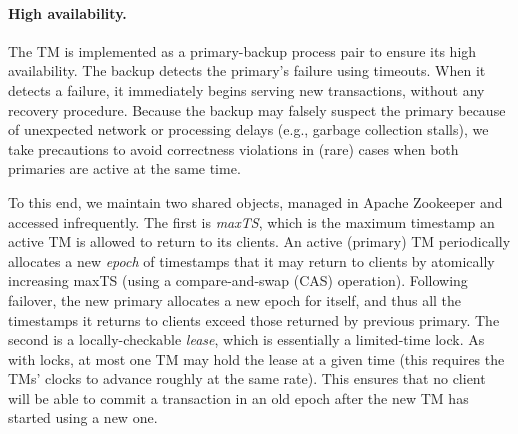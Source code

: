 \paragraph{High availability.} The TM is implemented as a primary-backup process pair to ensure its high availability. 
The backup detects the primary's failure using timeouts. When it detects a failure, it immediately begins serving new
transactions, without any recovery procedure. Because the backup may falsely suspect the primary because of
unexpected network or processing delays (e.g., garbage collection stalls), we take precautions to avoid correctness
violations in (rare) cases when both primaries are active at the same time.

To this end, we maintain two shared objects, managed in Apache Zookeeper and accessed infrequently.
The first is \emph{maxTS}, which is the maximum timestamp an active TM is allowed to return to its clients.
An active (primary) TM periodically allocates a new \emph{epoch} of timestamps that it may return to clients by atomically
increasing maxTS (using a compare-and-swap (CAS) operation).  
Following failover, the new primary  allocates a new epoch for itself, and thus all the timestamps it returns to clients
exceed those returned by previous primary. 
The second is a locally-checkable \emph{lease}, which is essentially a  limited-time lock. 
As with locks, at most one TM may hold the lease at a given time (this requires the TMs' clocks to advance roughly at the same rate). 
This ensures that no client will be able to commit a transaction in an old epoch after the new TM has started 
using a new one.



